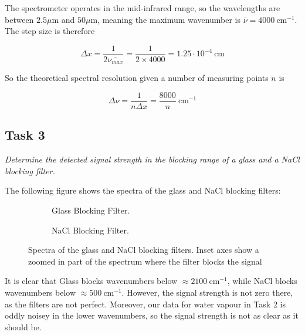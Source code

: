 \documentclass{article}
\begin{document}
The spectrometer operates in the mid-infrared range, so the wavelengths are between $2.5 \mu \text{m}$ and $50  \mu \text{m}$, meaning the maximum wavenumber is $\bar{\nu} = 4000 \ \text{cm}^{-1}$. The step size is therefore

\begin{equation*}
	\Delta x = \frac{1}{2 \bar{\nu_{max}}} = \frac{1}{2 \times 4000} = \boxed{1.25 \cdot 10^{-4} \ \text{cm}}
\end{equation*}

So the theoretical spectral resolution given a number of measuring points $n$ is

\begin{equation*}
	\Delta \nu = \frac{1}{n \Delta x} = \boxed{\frac{8000}{n} \ \text{cm}^{-1}}
\end{equation*}

\pagebreak{}

\subsection{Task 3}

\textit{Determine the detected signal strength in the blocking range of a glass and a NaCl blocking filter.}

The following figure shows the spectra of the glass and NaCl blocking filters:

\begin{figure}[h!]
	\centering
	\begin{subfigure}[t]{0.48\textwidth}
		\centering
		\scalebox{0.5}{}
		\caption{Glass Blocking Filter.}
		\label{fig:glass}
	\end{subfigure} \hfill
	\begin{subfigure}[t]{0.48\textwidth}
		\centering
		\scalebox{0.5}{}
		\caption{NaCl Blocking Filter.}
		\label{fig:nacl}
	\end{subfigure}
	\caption{Spectra of the glass and NaCl blocking filters. Inset axes show a zoomed in part of the spectrum where the filter blocks the signal}
	\label{fig:glass_nacl}
\end{figure}

It is clear that Glass blocks wavenumbers below $\approx 2100 \ \text{cm}^{-1}$, while NaCl blocks wavenumbers below $\approx 500 \ \text{cm}^{-1}$. However, the signal strength is not zero there, as the filters are not perfect.
Moreover, our data for water vapour in Task 2 is oddly noisey in the lower wavenumbers, so the signal strength is not as clear as it should be.  
\end{document}
